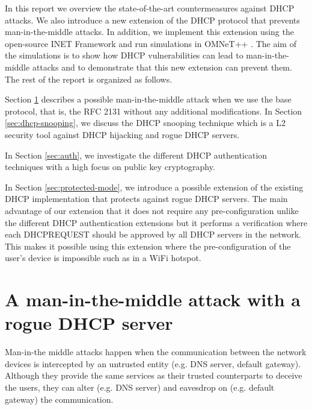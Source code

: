 \documentclass[letterpaper, 10 pt, conference]{ieeeconf}  %
\begin{document}
In this report we overview the state-of-the-art countermeasures against DHCP attacks. We also introduce a new extension of the DHCP protocol that prevents man-in-the-middle attacks. In addition, we implement this extension using the open-source INET Framework \cite{inet} and run simulations in OMNeT++ \cite{Varga:2008:OOS:1416222.1416290}. The aim of the simulations is to show how DHCP vulnerabilities can lead to man-in-the-middle attacks and to demonstrate that this new extension can prevent them. The rest of the report is organized as follows.

Section \ref{sec:man-in-the-middle} describes a possible man-in-the-middle attack when we use the base protocol, that is, the RFC 2131 without any additional modifications. In Section \ref{sec:dhcp-snooping}, we discuss the DHCP snooping technique which is a L2 security tool against DHCP hijacking and rogue DHCP servers. 

In Section \ref{sec:auth}, we investigate the different DHCP authentication techniques with a high focus on public key cryptography.

In Section \ref{sec:protected-mode}, we introduce a possible extension of the existing DHCP implementation that protects against rogue DHCP servers. The main advantage of our extension that it does not require any pre-configuration unlike the different DHCP authentication extensions but it performs a verification where each DHCPREQUEST should be approved by all DHCP servers in the network. This makes it possible using this extension where the pre-configuration of the user's device is impossible such as in a WiFi hotspot.
 
\section{A man-in-the-middle attack with a rogue DHCP server}\label{sec:man-in-the-middle}
Man-in-the middle attacks happen when the communication between the network devices is intercepted by an untrusted entity (e.g. DNS server, default gateway). Although they provide the same services as their trusted counterparts to deceive the users, they can alter (e.g. DNS server) and eavesdrop on (e.g. default gateway) the communication.
\end{document}
